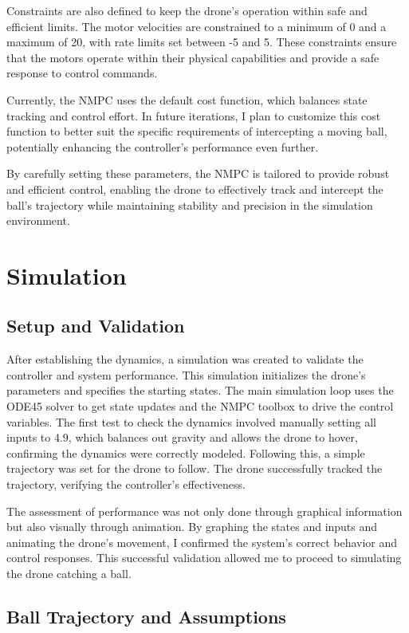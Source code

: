 \documentclass{UoNMCHA}
\numberwithin{equation}{section}
\begin{document}
Constraints are also defined to keep the drone's operation within safe and efficient limits. The motor velocities are constrained to a minimum of 0 and a maximum of 20, with rate limits set between -5 and 5. These constraints ensure that the motors operate within their physical capabilities and provide a safe response to control commands.

Currently, the NMPC uses the default cost function, which balances state tracking and control effort. In future iterations, I plan to customize this cost function to better suit the specific requirements of intercepting a moving ball, potentially enhancing the controller's performance even further.

By carefully setting these parameters, the NMPC is tailored to provide robust and efficient control, enabling the drone to effectively track and intercept the ball's trajectory while maintaining stability and precision in the simulation environment.

\section{Simulation}
\subsection{Setup and Validation}

After establishing the dynamics, a simulation was created to validate the controller and system performance. This simulation initializes the drone's parameters and specifies the starting states. The main simulation loop uses the ODE45 solver \cite{website:KalmanFilter} to get state updates and the NMPC toolbox \cite{website:NMPCSIM} to drive the control variables.
The first test to check the dynamics involved manually setting all inputs to 4.9, which balances out gravity and allows the drone to hover, confirming the dynamics were correctly modeled. Following this, a simple trajectory was set for the drone to follow. The drone successfully tracked the trajectory, verifying the controller's effectiveness. 

The assessment of performance  was not only done through graphical information but also visually through animation. By graphing the states and inputs and animating the drone's movement, I confirmed the system's correct behavior and control responses. This successful validation allowed me to proceed to simulating the drone catching a ball.

\subsection{Ball Trajectory and Assumptions}
\end{document}
